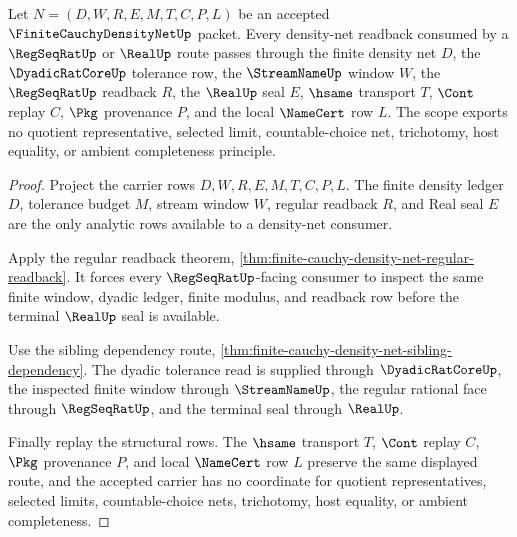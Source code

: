 \begin{theorem}
\label{thm:finite-cauchy-density-net-regular-readback-scope}
Let $N=(D,W,R,E,M,T,C,P,L)$ be an accepted $\FiniteCauchyDensityNetUp$ packet. Every density-net readback consumed by a $\RegSeqRatUp$ or $\RealUp$ route passes through the finite density net $D$, the $\DyadicRatCoreUp$ tolerance row, the $\StreamNameUp$ window $W$, the $\RegSeqRatUp$ readback $R$, the $\RealUp$ seal $E$, $\hsame$ transport $T$, $\Cont$ replay $C$, $\Pkg$ provenance $P$, and the local $\NameCert$ row $L$. The scope exports no quotient representative, selected limit, countable-choice net, trichotomy, host equality, or ambient completeness principle.
\end{theorem}
\begin{proof}
Project the carrier rows $D,W,R,E,M,T,C,P,L$. The finite density ledger $D$, tolerance budget $M$, stream window $W$, regular readback $R$, and Real seal $E$ are the only analytic rows available to a density-net consumer.

Apply the regular readback theorem, \autoref{thm:finite-cauchy-density-net-regular-readback}. It forces every $\RegSeqRatUp$-facing consumer to inspect the same finite window, dyadic ledger, finite modulus, and readback row before the terminal $\RealUp$ seal is available.

Use the sibling dependency route, \autoref{thm:finite-cauchy-density-net-sibling-dependency}. The dyadic tolerance read is supplied through $\DyadicRatCoreUp$, the inspected finite window through $\StreamNameUp$, the regular rational face through $\RegSeqRatUp$, and the terminal seal through $\RealUp$.

Finally replay the structural rows. The $\hsame$ transport $T$, $\Cont$ replay $C$, $\Pkg$ provenance $P$, and local $\NameCert$ row $L$ preserve the same displayed route, and the accepted carrier has no coordinate for quotient representatives, selected limits, countable-choice nets, trichotomy, host equality, or ambient completeness.
\end{proof}
